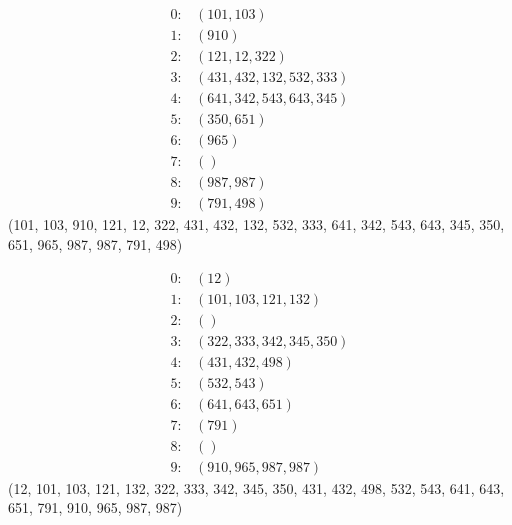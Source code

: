 \documentclass[18pt]{extarticle}
\begin{document}
\begin{align*}
    0: & \left(101, 103\right) \\
    1: & \left(910\right) \\
    2: & \left(121, 12, 322\right) \\
    3: & \left(431, 432, 132, 532, 333\right) \\
    4: & \left(641, 342, 543, 643, 345\right) \\
    5: & \left(350, 651\right) \\
    6: & \left(965\right) \\
    7: & \left(\right) \\
    8: & \left(987, 987\right) \\
    9: & \left(791, 498\right)
\end{align*}
(101, 103, 910, 121, 12, 322, 431, 432, 132, 532, 333, 641, 342, 543, 643, 345, 350, 651, 965, 987, 987, 791, 498)

\begin{align*}
    0: & \left(12\right) \\
    1: & \left(101, 103, 121, 132\right) \\
    2: & \left(\right) \\
    3: & \left(322, 333, 342, 345, 350\right) \\
    4: & \left(431, 432, 498\right) \\
    5: & \left(532, 543\right) \\
    6: & \left(641, 643, 651\right) \\
    7: & \left(791\right) \\
    8: & \left(\right) \\
    9: & \left(910, 965, 987, 987\right)
\end{align*}
(12, 101, 103, 121, 132, 322, 333, 342, 345, 350, 431, 432, 498, 532, 543, 641, 643, 651, 791, 910, 965, 987, 987)
\end{document}
